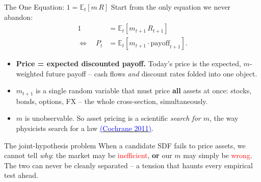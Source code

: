 \documentclass{beamer}
\newcommand{\E}{\mathbb{E}}
\begin{document}
\begin{frame}{The One Equation: $1 = \E_t[m\,R]$}
\justifying
Start from the only equation we never abandon:
\begin{align}
  1 &= \E_t\!\left[m_{t+1}\,R_{t+1}\right] \\[2pt]
  \Longleftrightarrow\quad P_t &= \E_t\!\left[m_{t+1}\cdot \text{payoff}_{t+1}\right].
\end{align}
\begin{itemize}
  \item \textbf{Price = expected discounted payoff.} Today's price is the expected, $m$-weighted future payoff -- cash flows \textit{and} discount rates folded into one object.
  \item $m_{t+1}$ is a \alert{single random variable} that must price \textbf{all} assets at once: stocks, bonds, options, FX -- the whole cross-section, simultaneously.
  \item $m$ is \alert{unobservable}. So asset pricing is a scientific \textit{search for $m$}, the way physicists search for a law \href{https://doi.org/10.1111/j.1540-6261.2011.01671.x}{\textcolor{blue}{(Cochrane 2011)}}.
\end{itemize}
\begin{block}{The joint-hypothesis problem}
When a candidate SDF fails to price assets, we cannot tell \textit{why}: the market may be \textcolor{red}{inefficient}, \textbf{or} our $m$ may simply be \textcolor{red}{wrong}. The two can never be cleanly separated -- a tension that haunts every empirical test ahead.
\end{block}
\end{frame}
\end{document}
